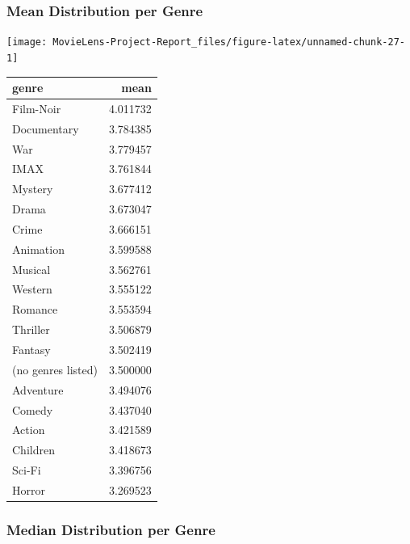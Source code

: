 \documentclass[
]{article}
\begin{document}
\hypertarget{mean-distribution-per-genre}{%
\subsubsection{Mean Distribution per
Genre}\label{mean-distribution-per-genre}}

\begin{center}\texttt{[image: MovieLens-Project-Report\_files/figure-latex/unnamed-chunk-27-1]} \end{center}

\begin{table}[!h]
\centering\begingroup\fontsize{10}{12}\selectfont

\begin{tabular}{l|r}
\hline
genre & mean\\
\hline
Film-Noir & 4.011732\\
\hline
Documentary & 3.784385\\
\hline
War & 3.779457\\
\hline
IMAX & 3.761844\\
\hline
Mystery & 3.677412\\
\hline
Drama & 3.673047\\
\hline
Crime & 3.666151\\
\hline
Animation & 3.599588\\
\hline
Musical & 3.562761\\
\hline
Western & 3.555122\\
\hline
Romance & 3.553594\\
\hline
Thriller & 3.506879\\
\hline
Fantasy & 3.502419\\
\hline
(no genres listed) & 3.500000\\
\hline
Adventure & 3.494076\\
\hline
Comedy & 3.437040\\
\hline
Action & 3.421589\\
\hline
Children & 3.418673\\
\hline
Sci-Fi & 3.396756\\
\hline
Horror & 3.269523\\
\hline
\end{tabular}
\endgroup{}
\end{table}

\hypertarget{median-distribution-per-genre}{%
\subsubsection{Median Distribution per
Genre}\label{median-distribution-per-genre}}
\end{document}
